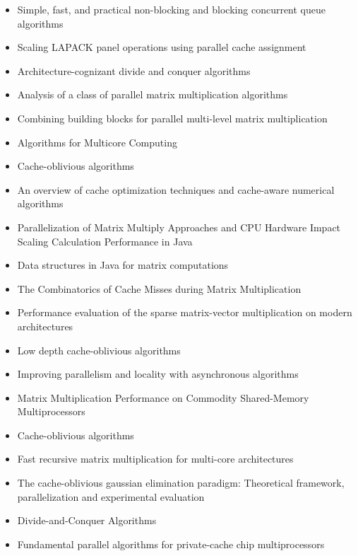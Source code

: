 \begin{itemize}
  \cite{Yuan2009}
\item Simple, fast, and practical non-blocking and blocking concurrent
  queue algorithms \cite{Michael1996}
\item Scaling LAPACK panel operations using parallel cache assignment
  \cite{Castaldo2010}
\item Architecture-cognizant divide and conquer algorithms
  \cite{Gatlin1999}
\item Analysis of a class of parallel matrix multiplication algorithms
  \cite{Gunnels1998}
\item Combining building blocks for parallel multi-level matrix
  multiplication \cite{Hunold2008}
\item Algorithms for Multicore Computing \cite{Ramachandran2008}
\item Cache-oblivious algorithms \cite{Frigo1999}
\item An overview of cache optimization techniques and cache-aware
  numerical algorithms \cite{Kowarschik2003}
\item Parallelization of Matrix Multiply Approaches and CPU Hardware
  Impact Scaling Calculation Performance in Java \cite{Kim2010}
\item Data structures in Java for matrix computations
  \cite{Gundersen2004}
\item The Combinatorics of Cache Misses during Matrix Multiplication
  \cite{Chatterjee2000}
\item Performance evaluation of the sparse matrix-vector
  multiplication on modern architectures \cite{Goumas2009}
\item Low depth cache-oblivious algorithms \cite{Blelloch2009}
\item Improving parallelism and locality with asynchronous algorithms
  \cite{Liu2010}
\item Matrix Multiplication Performance on Commodity Shared-Memory
  Multiprocessors \cite{Tsilikas2004}
\item Cache-oblivious algorithms \cite{Prokop1999}
\item Fast recursive matrix multiplication for multi-core
  architectures \cite{Runger2010}
\item The cache-oblivious gaussian elimination paradigm: Theoretical
  framework, parallelization and experimental evaluation
  \cite{Chowdhury2007}
\item Divide-and-Conquer Algorithms \cite{Gurari2010}
\item Fundamental parallel algorithms for private-cache chip
  multiprocessors \cite{Arge2008}

\end{itemize}
